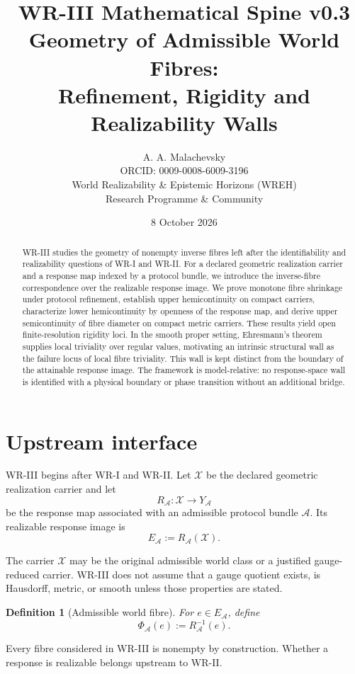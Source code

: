 \documentclass[11pt]{article}
\title{\textbf{WR-III Mathematical Spine v0.3}\\[4pt]
\large Geometry of Admissible World Fibres:\\
Refinement, Rigidity and Realizability Walls}
\author{A. A. Malachevsky\\
ORCID: 0009-0008-6009-3196\\
World Realizability \& Epistemic Horizons (WREH)\\
Research Programme \& Community}
\date{8 October 2026}
\newtheorem{definition}{Definition}[section]
\newcommand{\X}{\mathcal X}
\newcommand{\Acal}{\mathcal A}
\begin{document}
\maketitle

\begin{abstract}
WR-III studies the geometry of nonempty inverse fibres left after the
identifiability and realizability questions of WR-I and WR-II. For a declared
geometric realization carrier and a response map indexed by a protocol bundle,
we introduce the inverse-fibre correspondence over the realizable response
image. We prove monotone fibre shrinkage under protocol refinement, establish
upper hemicontinuity on compact carriers, characterize lower hemicontinuity by
openness of the response map, and derive upper semicontinuity of fibre diameter
on compact metric carriers. These results yield open finite-resolution
rigidity loci. In the smooth proper setting, Ehresmann's theorem supplies local
triviality over regular values, motivating an intrinsic structural wall as the
failure locus of local fibre triviality. This wall is kept distinct from the
boundary of the attainable response image. The framework is model-relative:
no response-space wall is identified with a physical boundary or phase
transition without an additional bridge.
\end{abstract}

\section{Upstream interface}

WR-III begins after WR-I and WR-II. Let \(\X\) be the declared geometric
realization carrier and let
\[
R_{\Acal}:\X\to Y_{\Acal}
\]
be the response map associated with an admissible protocol bundle \(\Acal\).
Its realizable response image is
\[
E_{\Acal}:=R_{\Acal}(\X).
\]

The carrier \(\X\) may be the original admissible world class or a justified
gauge-reduced carrier. WR-III does not assume that a gauge quotient exists, is
Hausdorff, metric, or smooth unless those properties are stated.

\begin{definition}[Admissible world fibre]
For \(e\in E_{\Acal}\), define
\[
\Phi_{\Acal}(e):=R_{\Acal}^{-1}(e).
\]
\end{definition}

Every fibre considered in WR-III is nonempty by construction. Whether a
response is realizable belongs upstream to WR-II.
\end{document}
